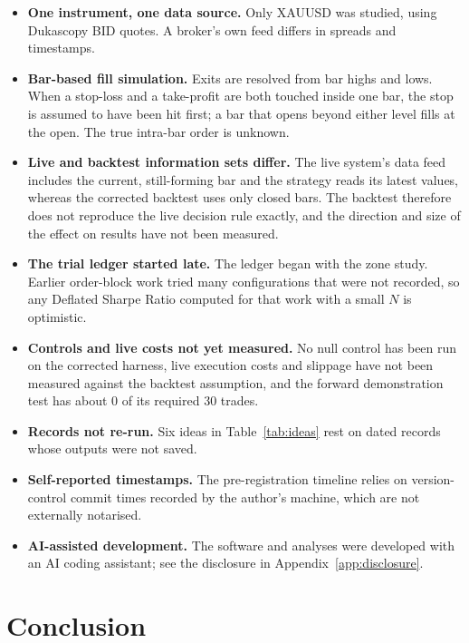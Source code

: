 \documentclass[11pt,a4paper]{article}
\begin{document}
\begin{itemize}
\item \textbf{One instrument, one data source.} Only XAUUSD was studied, using Dukascopy BID
quotes. A broker's own feed differs in spreads and timestamps. %
\item \textbf{Bar-based fill simulation.} Exits are resolved from bar highs and lows. When a
stop-loss and a take-profit are both touched inside one bar, the stop is assumed to have been hit
first; a bar that opens beyond either level fills at the open. The true intra-bar order is
unknown. %
\item \textbf{Live and backtest information sets differ.} The live system's data feed includes
the current, still-forming bar and the strategy reads its latest values, whereas the corrected
backtest uses only closed bars. The backtest therefore does not reproduce the live decision rule
exactly, and the direction and size of the effect on results have not been measured. %
\item \textbf{The trial ledger started late.} The ledger began with the zone study. Earlier
order-block work tried many configurations that were not recorded, so any Deflated Sharpe Ratio
computed for that work with a small $N$ is optimistic.
\item \textbf{Controls and live costs not yet measured.} No null control has been run on the
corrected harness, live execution costs and slippage have not been measured against the backtest
assumption, and the forward demonstration test has about 0 of its required 30 trades. %
\item \textbf{Records not re-run.} Six ideas in Table~\ref{tab:ideas} rest on dated records
whose outputs were not saved.
\item \textbf{Self-reported timestamps.} The pre-registration timeline relies on version-control
commit times recorded by the author's machine, which are not externally notarised. %
\item \textbf{AI-assisted development.} The software and analyses were developed with an AI
coding assistant; see the disclosure in Appendix~\ref{app:disclosure}.
\end{itemize}

\section{Conclusion}
\end{document}
